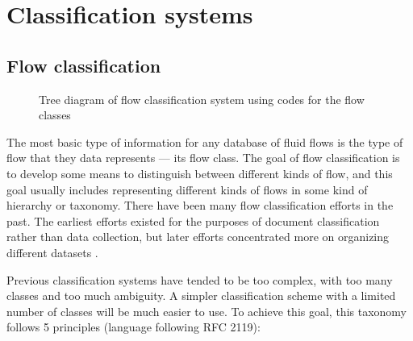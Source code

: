 %
\chapter{Classification systems}

\section{Flow classification}



\begin{figure}
    \centering
    
    \caption{Tree diagram of flow classification system using codes for the
    flow classes}
\end{figure}

The most basic type of information for any database of fluid flows is the type
of flow that they data represents --- its flow class.  The goal of flow
classification is to develop some means to distinguish between different kinds
of flow, and this goal usually includes representing different kinds of flows
in some kind of hierarchy or taxonomy.  There have been many flow
classification efforts in the past.  The earliest efforts existed for the
purposes of document classification \citep{ZWB+1944+deu+RPRT} rather than data
collection, but later efforts concentrated more on organizing different
datasets \citep{KlineSJ+1982+eng+BOOK+V3,ERCOFTAC+DBASE,AGARD+1998+eng+RPRT}.

Previous classification systems have tended to be too complex, with too many
classes and too much ambiguity.  A simpler classification scheme with a limited
number of classes will be much easier to use.  To achieve this goal, this
taxonomy follows 5 principles (language following RFC 2119):

